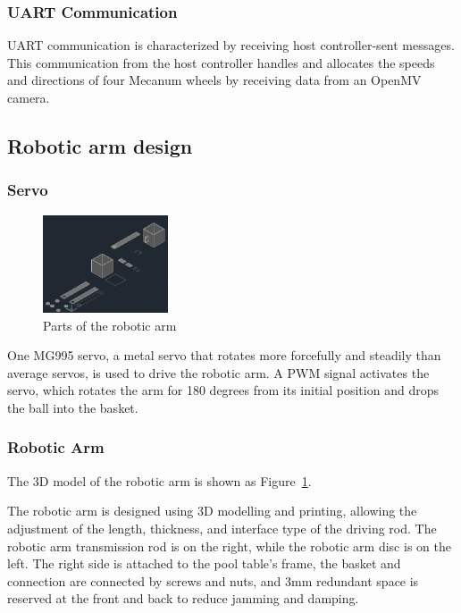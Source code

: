 \documentclass{solutionclass} %
\begin{document}
        \subsubsection{UART Communication}
        UART communication is characterized by receiving host controller-sent messages. This communication from the host controller handles and allocates the speeds and directions of four Mecanum wheels by receiving data from an OpenMV camera.
    
    \subsection*{Robotic arm design}
        
        \newpage
        
        \subsubsection{Servo}
        
        \begin{figure}
            \includegraphics[width=0.33\textwidth]{figure/3dprint.png}
          \caption{Parts of the robotic arm}
          \label{3d}
        \end{figure}
        
        One MG995 servo, a metal servo that rotates more forcefully and steadily than average servos, is used to drive the robotic arm. A PWM signal activates the servo, which rotates the arm for 180 degrees from its initial position and drops the ball into the basket.
        
        \subsubsection{Robotic Arm}
        The 3D model of the robotic arm is shown as Figure~\ref{3d}.
        
        
        The robotic arm is designed using 3D modelling and printing, allowing the adjustment of the length, thickness, and interface type of the driving rod. The robotic arm transmission rod is on the right, while the robotic arm disc is on the left. The right side is attached to the pool table's frame, the basket and connection are connected by screws and nuts, and 3mm redundant space is reserved at the front and back to reduce jamming and damping.      
        
\end{document}
